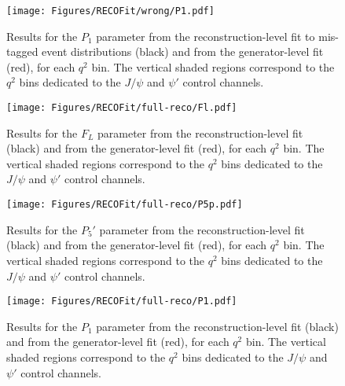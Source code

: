 \begin{figure}[!hbt]
  \centering
  \texttt{[image: Figures/RECOFit/wrong/P1.pdf]}
  \caption{Results for the $P_1$ parameter from the reconstruction-level fit to mis-tagged event distributions (black) and from the generator-level fit (red), for each $q^2$ bin.
    The vertical shaded regions correspond to the $q^2$ bins dedicated to the $J/\psi$ and $\psi'$ control channels.}
  \label{fig:wrong-closure-p1}
\end{figure}

\begin{figure}[!hbt]
  \centering
  \texttt{[image: Figures/RECOFit/full-reco/Fl.pdf]}
  \caption{Results for the $F_L$ parameter from the reconstruction-level fit (black) and from the generator-level fit (red), for each $q^2$ bin.
    The vertical shaded regions correspond to the $q^2$ bins dedicated to the $J/\psi$ and $\psi'$ control channels.}
  \label{fig:fullreco-closure-fl}
\end{figure}


\begin{figure}[!hbt]
  \centering
  \texttt{[image: Figures/RECOFit/full-reco/P5p.pdf]}
  \caption{Results for the $P_5'$ parameter from the reconstruction-level fit (black) and from the generator-level fit (red), for each $q^2$ bin.
    The vertical shaded regions correspond to the $q^2$ bins dedicated to the $J/\psi$ and $\psi'$ control channels.}
  \label{fig:fullreco-closure-p5p}
\end{figure}


\begin{figure}[!hbt]
  \centering
  \texttt{[image: Figures/RECOFit/full-reco/P1.pdf]}
  \caption{Results for the $P_1$ parameter from the reconstruction-level fit (black) and from the generator-level fit (red), for each $q^2$ bin.
    The vertical shaded regions correspond to the $q^2$ bins dedicated to the $J/\psi$ and $\psi'$ control channels.}
  \label{fig:fullreco-closure-p1}
\end{figure}

\clearpage


